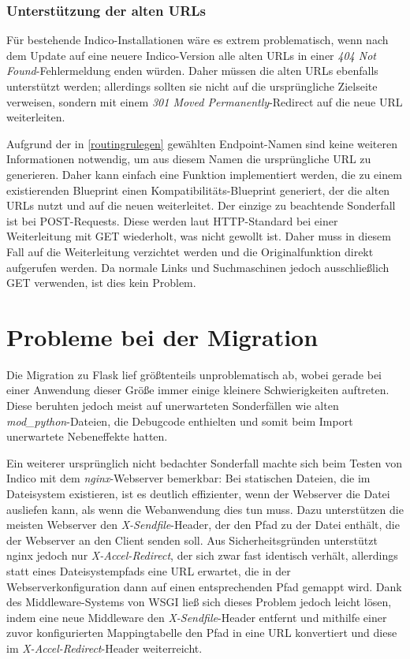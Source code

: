 \subsubsection{Unterstützung der alten URLs}

Für bestehende Indico-Installationen wäre es extrem problematisch, wenn nach dem Update auf eine
neuere Indico-Version alle alten URLs in einer \emph{404 Not Found}-Fehlermeldung enden würden.
Daher müssen die alten URLs ebenfalls unterstützt werden; allerdings sollten sie nicht auf die
ursprüngliche Zielseite verweisen, sondern mit einem \emph{301 Moved Permanently}-Redirect auf die
neue URL weiterleiten.

Aufgrund der in \autoref{routingrulegen} gewählten Endpoint-Namen sind keine weiteren Informationen
notwendig, um aus diesem Namen die ursprüngliche URL zu generieren. Daher kann einfach eine Funktion
implementiert werden, die zu einem existierenden Blueprint einen Kompatibilitäts-Blueprint
generiert, der die alten URLs nutzt und auf die neuen weiterleitet. Der einzige zu beachtende
Sonderfall ist bei POST-Requests. Diese werden laut HTTP-Standard bei einer Weiterleitung mit GET
wiederholt, was nicht gewollt ist. Daher muss in diesem Fall auf die Weiterleitung verzichtet werden
und die Originalfunktion direkt aufgerufen werden. Da normale Links und Suchmaschinen jedoch
ausschließlich GET verwenden, ist dies kein Problem.


\section{Probleme bei der Migration}

Die Migration zu Flask lief größtenteils unproblematisch ab, wobei gerade bei einer Anwendung dieser
Größe immer einige kleinere Schwierigkeiten auftreten. Diese beruhten jedoch meist auf unerwarteten
Sonderfällen wie alten \emph{mod\_python}-Dateien, die Debugcode enthielten und somit beim Import
unerwartete Nebeneffekte hatten.

Ein weiterer ursprünglich nicht bedachter Sonderfall machte sich beim Testen von Indico mit dem
\emph{nginx}-Webserver bemerkbar: Bei statischen Dateien, die im Dateisystem existieren, ist es
deutlich effizienter, wenn der Webserver die Datei ausliefen kann, als wenn die Webanwendung dies
tun muss. Dazu unterstützen die meisten Webserver den \emph{X-Sendfile}-Header, der den Pfad zu der
Datei enthält, die der Webserver an den Client senden soll. Aus Sicherheitsgründen unterstützt nginx
jedoch nur \emph{X-Accel-Redirect}, der sich zwar fast identisch verhält, allerdings statt eines
Dateisystempfads eine URL erwartet, die in der Webserverkonfiguration dann auf einen entsprechenden
Pfad gemappt wird. Dank des Middleware-Systems von WSGI ließ sich dieses Problem jedoch leicht
lösen, indem eine neue Middleware den \emph{X-Sendfile}-Header entfernt und mithilfe einer zuvor
konfigurierten Mappingtabelle den Pfad in eine URL konvertiert und diese im
\emph{X-Accel-Redirect}-Header weiterreicht.


